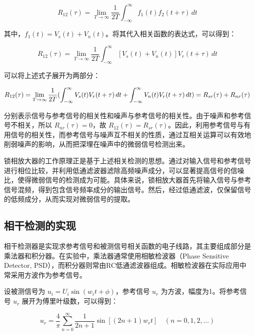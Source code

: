 \documentclass[12pt,a4paper]{article}
\begin{document}
\begin{equation}
R_{12}(\tau) = \lim_{T\rightarrow \infty}\frac{1}{2T}\int_{-\infty}^{\infty} f_1(t) f_2(t + \tau) \, dt
\end{equation}

其中，$f_1(t) = V_s(t) + V_n(t)$。将其代入相关函数的表达式，可以得到：

\begin{equation}
R_{12}(\tau) = \lim_{T\rightarrow \infty}\frac{1}{2T}\int_{-\infty}^{\infty} [V_s(t) + V_n(t)] V_r(t + \tau) \, dt
\end{equation}

可以将上述式子展开为两部分：

\begin{equation}
R_{12}(\tau) = \lim_{T\rightarrow \infty}\frac{1}{2T}(\int_{-\infty}^{\infty} V_s(t) V_r(t + \tau) \, dt + \int_{-\infty}^{\infty} V_n(t) V_r(t + \tau) \, dt)\\
=R_{s r}(\tau)+R_{n r}(\tau)
\end{equation}

分别表示信号与参考信号的相关性和噪声与参考信号的相关性。由于噪声和参考信号不相关，所以 $R_{nr}(\tau) = 0$，故 $R_{12}(\tau) = R_{sr}(\tau)$。因此，利用参考信号与有用信号的相关性，而参考信号与噪声互不相关的性质，通过互相关运算可以有效地削弱噪声的影响，从而把深埋在噪声中的微弱信号检测出来。

锁相放大器的工作原理正是基于上述相关检测的思想。通过对输入信号和参考信号进行相位比较，并利用低通滤波器滤除高频噪声成分，可以显著提高信号的信噪比，使得微弱信号的检测成为可能。具体来说，锁相放大器首先将输入信号与参考信号混频，得到包含信号频率成分的输出信号。然后，经过低通滤波，仅保留信号的低频成分，从而实现对微弱信号的提取。

\subsection{相干检测的实现}

相干检测器是实现求参考信号和被测信号相关函数的电子线路，其主要组成部分是乘法器和积分器。在实验中，乘法器通常使用相敏检波器（Phase Sensitive Detector, PSD），而积分器则常由RC低通滤波器组成。相敏检波器在实际应用中常采用方波作为参考信号。

设被测信号为 $u_i = U_i \sin(w_i t + \phi)$，参考信号 $u_r$ 为方波，幅度为1。将参考信号 $u_r$ 展开为傅里叶级数，可以得到：

\begin{equation}
u_r = \frac{4}{\pi} \sum_{n=0}^{\infty} \frac{1}{2n+1} \sin[(2n+1) w_r t] \quad (n=0,1,2,\ldots)
\end{equation}
\end{document}
